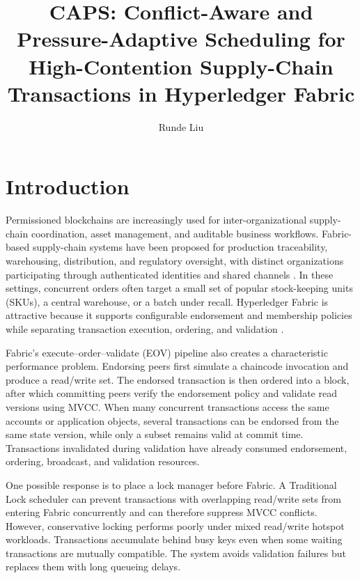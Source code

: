 \documentclass[fleqn,10pt,lineno]{wlpeerj}
\title{CAPS: Conflict-Aware and Pressure-Adaptive Scheduling for High-Contention Supply-Chain Transactions in Hyperledger Fabric}
\author[1]{Runde Liu}
\affil[1]{[Affiliation to be completed before submission]}
\begin{document}
\flushbottom
\maketitle
\thispagestyle{empty}

\section*{Introduction}

Permissioned blockchains are increasingly used for inter-organizational supply-chain coordination, asset management, and auditable business workflows. Fabric-based supply-chain systems have been proposed for production traceability, warehousing, distribution, and regulatory oversight, with distinct organizations participating through authenticated identities and shared channels \citep{chen2023tea}. In these settings, concurrent orders often target a small set of popular stock-keeping units (SKUs), a central warehouse, or a batch under recall. Hyperledger Fabric is attractive because it supports configurable endorsement and membership policies while separating transaction execution, ordering, and validation \citep{androulaki2018fabric,fabric25docs}.

Fabric's execute--order--validate (EOV) pipeline also creates a characteristic performance problem. Endorsing peers first simulate a chaincode invocation and produce a read/write set. The endorsed transaction is then ordered into a block, after which committing peers verify the endorsement policy and validate read versions using MVCC. When many concurrent transactions access the same accounts or application objects, several transactions can be endorsed from the same state version, while only a subset remains valid at commit time. Transactions invalidated during validation have already consumed endorsement, ordering, broadcast, and validation resources.

One possible response is to place a lock manager before Fabric. A Traditional Lock scheduler can prevent transactions with overlapping read/write sets from entering Fabric concurrently and can therefore suppress MVCC conflicts. However, conservative locking performs poorly under mixed read/write hotspot workloads. Transactions accumulate behind busy keys even when some waiting transactions are mutually compatible. The system avoids validation failures but replaces them with long queueing delays.
\end{document}

